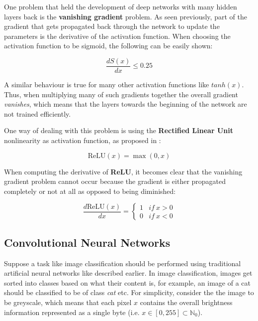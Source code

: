 One problem that held the development of deep networks with many hidden layers back is the \textbf{vanishing gradient} problem.
As seen previously, part of the gradient that gets propagated back through the network to update the parameters is the derivative of the activation function.
When choosing the activation function to be sigmoid, the following can be easily shown:

\begin{equation}
    \frac{dS(x)}{dx} \leq 0.25
\end{equation}

A similar behaviour is true for many other activation functions like $tanh(x)$.
Thus, when multiplying many of such gradients together the overall gradient \textit{vanishes}, which means that the layers towards the beginning of the network are not trained efficiently.

One way of dealing with this problem is using the \textbf{Rectified Linear Unit} nonlinearity as activation function, as proposed in \cite{nair_rectified_2010}:

\begin{equation}
    \text{ReLU}(x) = \max (0, x)
\end{equation}

When computing the derivative of \textbf{ReLU}, it becomes clear that the vanishing gradient problem cannot occur because the gradient is either propagated completely or not at all as opposed to being diminished:

\begin{equation}
    \frac{d \text{ReLU}(x)}{dx} = \begin{cases}
        1 & if ~ x > 0 \\
        0 & if ~ x < 0
    \end{cases}
\end{equation}

\subsection{Convolutional Neural Networks}
Suppose a task like image classification should be performed using traditional artificial neural networks like described earlier.
In image classification, images get sorted into classes based on what their content is, for example, an image of a cat should be classified to be of class \textit{cat} etc.
For simplicity, consider the the image to be greyscale, which means that each pixel $x$ contains the overall brightness information represented as a single byte (i.e. $x \in [0,255] \subset \mathbb{N}_0$).

